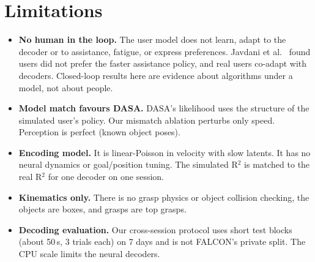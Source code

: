 \section{Limitations}
\begin{itemize}
\item \textbf{No human in the loop.} The user model does not learn, adapt to the decoder
  or to assistance, fatigue, or express preferences. Javdani et
  al.~\cite{javdani2015shared} found users did not prefer the faster assistance policy,
  and real users co-adapt with decoders. Closed-loop results here are evidence about
  algorithms under a model, not about people.
\item \textbf{Model match favours DASA.} DASA's likelihood uses the structure of the
  simulated user's policy. Our mismatch ablation perturbs only speed. Perception is
  perfect (known object poses).
\item \textbf{Encoding model.} It is linear-Poisson in velocity with slow latents. It has
  no neural dynamics or goal/position tuning. The simulated R$^2$ is matched to the
  real R$^2$ for one decoder on one session.
\item \textbf{Kinematics only.} There is no grasp physics or object collision checking,
  the objects are boxes, and grasps are top grasps.
\item \textbf{Decoding evaluation.} Our cross-session protocol uses short test blocks
  (about 50\,s, 3 trials each) on 7 days and is not FALCON's private split. The CPU
  scale limits the neural decoders.
\end{itemize}

